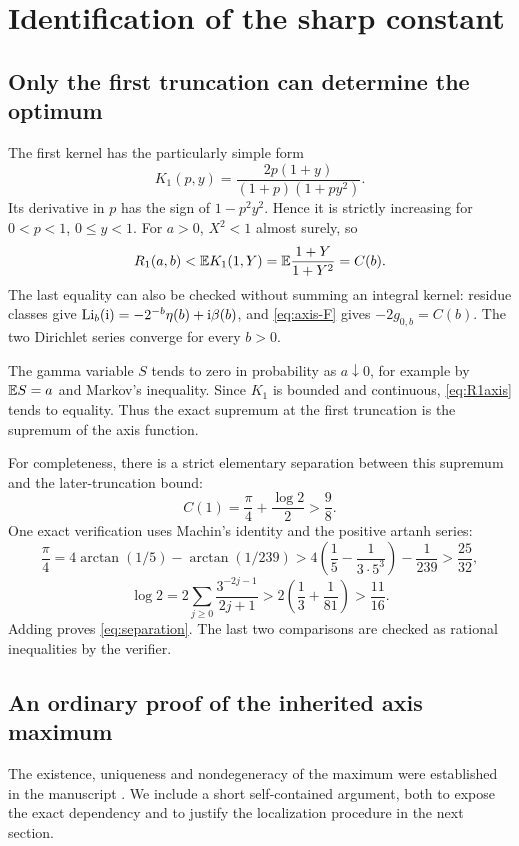 \section{Identification of the sharp constant}
\label{sec:sharp}
\subsection{Only the first truncation can determine the optimum}
The first kernel has the particularly simple form
\begin{equation}\label{eq:K1}
 K_1(p,y)=\frac{2p(1+y)}{(1+p)(1+py^2)}.
\end{equation}
Its derivative in $p$ has the sign of $1-p^2y^2$. Hence it is strictly increasing for $0<p<1$, $0\le y<1$. For $a>0$, $X^2<1$ almost surely, so
\begin{equation}\label{eq:R1axis}
 R_1(a,b)<\mathbb E K_1(1,Y)=\mathbb E\frac{1+Y}{1+Y^2}=C(b).
\end{equation}
The last equality can also be checked without summing an integral kernel: residue classes give
$\operatorname{Li}_b(\mathrm i)=-2^{-b}\eta(b)+\mathrm i\beta(b)$, and \eqref{eq:axis-F} gives $-2g_{0,b}=C(b)$. The two Dirichlet series converge for every $b>0$.

The gamma variable $S$ tends to zero in probability as $a\downarrow0$, for example by $\mathbb E S=a$ and Markov's inequality. Since $K_1$ is bounded and continuous, \eqref{eq:R1axis} tends to equality. Thus the exact supremum at the first truncation is the supremum of the axis function.

For completeness, there is a strict elementary separation between this supremum and the later-truncation bound:
\begin{equation}\label{eq:separation}
 C(1)=\frac\pi4+\frac{\log2}{2}>\frac98.
\end{equation}
One exact verification uses Machin's identity and the positive artanh series:
\[
 \frac\pi4=4\arctan(1/5)-\arctan(1/239)
 >4\left(\frac15-\frac1{3\cdot5^3}\right)-\frac1{239}
 >\frac{25}{32},
\]
\[
 \log2=2\sum_{j\ge0}\frac{3^{-2j-1}}{2j+1}
 >2\left(\frac13+\frac1{81}\right)>\frac{11}{16}.
\]
Adding proves \eqref{eq:separation}. The last two comparisons are checked as rational inequalities by the verifier.

\subsection{An ordinary proof of the inherited axis maximum}
The existence, uniqueness and nondegeneracy of the maximum were established in the manuscript \cite{RepoSubcritical}. We include a short self-contained argument, both to expose the exact dependency and to justify the localization procedure in the next section.

